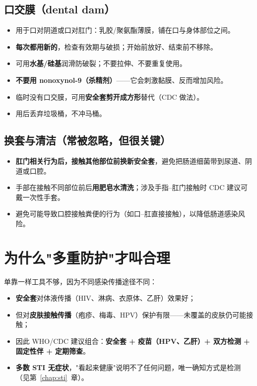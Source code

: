 \documentclass[12pt,UTF8,openany]{ctexbook}
\begin{document}
\subsection*{口交膜（dental dam）}

\begin{itemize}[leftmargin=2em]
  \item 用于口对阴道或口对肛门：乳胶/聚氨酯薄膜，铺在口与身体部位之间。
  \item \textbf{每次都用新的}，检查有效期与破损；开始前放好、结束前不移除。
  \item 可用\textbf{水基/硅基}润滑防破裂；不要拉伸、不要重复使用。
  \item \textbf{不要用 nonoxynol-9（杀精剂）}——它会刺激黏膜、反而增加风险。
  \item 临时没有口交膜，可用\textbf{安全套剪开成方形}替代（CDC 做法）。
  \item 用后丢弃垃圾桶，不冲马桶。
\end{itemize}

\subsection*{换套与清洁（常被忽略，但很关键）}

\begin{itemize}[leftmargin=2em]
  \item \textbf{肛门相关行为后，接触其他部位前换新安全套}，避免把肠道细菌带到尿道、阴道或口腔。
  \item 手部在接触不同部位前后\textbf{用肥皂水清洗}；涉及手指--肛门接触时 CDC 建议可戴一次性手套。
  \item 避免可能导致口腔接触粪便的行为（如口--肛直接接触），以降低肠道感染风险。
\end{itemize}

\section{为什么"多重防护"才叫合理}

单靠一样工具不够，因为不同感染传播途径不同：

\begin{itemize}[leftmargin=2em]
  \item \textbf{安全套}对体液传播（HIV、淋病、衣原体、乙肝）效果好；
  \item 但对\textbf{皮肤接触传播}（疱疹、梅毒、HPV）保护有限——未覆盖的皮肤仍可能接触；
  \item 因此 WHO/CDC 建议组合：\textbf{安全套 + 疫苗（HPV、乙肝）+ 双方检测 + 固定性伴 + 定期筛查}。
  \item \textbf{多数 STI 无症状}，"看起来健康"说明不了任何问题，唯一确知方式是检测
        （见第~\ref{chap:sti}~章）。
\end{itemize}
\end{document}
